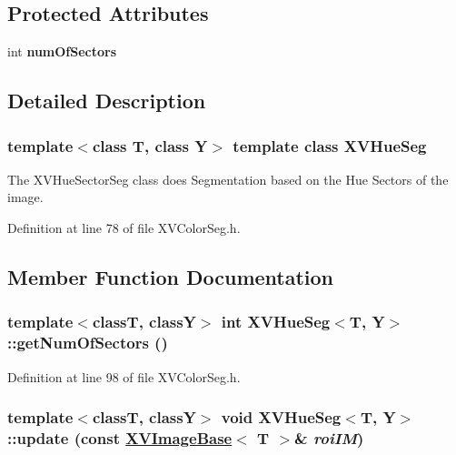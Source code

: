 \subsection*{Protected Attributes}
\begin{CompactItemize}
\item 
int {\bf num\-Of\-Sectors}
\end{CompactItemize}


\subsection{Detailed Description}
\subsubsection*{template$<$class T, class Y$>$  template class XVHue\-Seg}

The XVHue\-Sector\-Seg class does Segmentation based on the Hue Sectors of the image.





Definition at line 78 of file XVColor\-Seg.h.

\subsection{Member Function Documentation}
\label{XVHueSeg_a3}
\hypertarget{class_XVHueSeg_a3}{
\subsubsection[getNumOfSectors]{\setlength{\rightskip}{0pt plus 5cm}template$<$classT, classY$>$ int XVHue\-Seg$<$T, Y$>$::get\-Num\-Of\-Sectors ()}}




Definition at line 98 of file XVColor\-Seg.h.\label{XVHueSeg_a4}
\hypertarget{class_XVHueSeg_a4}{
\subsubsection[update]{\setlength{\rightskip}{0pt plus 5cm}template$<$classT, classY$>$ void XVHue\-Seg$<$T, Y$>$::update (const \hyperlink{class_XVImageBase}{XVImage\-Base}$<$ T $>$\& {\em roi\-IM})}}





